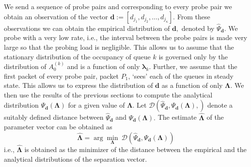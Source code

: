 \documentclass[11pt]{article}
\begin{document}
We send a sequence of probe pairs and corresponding to every probe
pair we obtain an observation of the vector $\mathbf{d}:= [d_{j_1},
d_{j_2}, \ldots, d_{j_\kappa}].$ From these observations we can obtain
the empirical distribution of $\mathbf{d},$ denoted by
$\hat{\Psi}_{\mathbf{d}}$. We probe with a very low rate, i.e., the
interval between the probe pairs is made very large so that the
probing load is negligible.  This allows us to assume that the
stationary distribution of the occupancy of queue $k$ is governed only
by the distribution of $A_0^{(k)}$ and is a function of only
$\mathbf{\lambda}_k.$ Further, we assume that the first packet of
every probe pair, packet $P_1$, `sees' each of the queues in steady
state. This allows us to express the distribution of $\mathbf{d}$ as a
function of only $\mathbf{\Lambda}.$ We then use the results of the
previous sections to compute the analytical distribution
$\Psi_\mathbf{d} (\mathbf{\Lambda})$ for a given value of
$\mathbf{\Lambda}.$ Let $\mathcal{D}\left( \hat{\Psi}_{\mathbf{d}},
  \Psi_\mathbf{d} (\mathbf{\Lambda}), \right)$ denote a suitably
defined distance between $\hat{\Psi}_{\mathbf{d}}$ and
$\Psi_\mathbf{d} (\mathbf{\Lambda}).$ The estimate
$\hat{\mathbf{\Lambda}}$ of the parameter vector can be obtained as
\begin{displaymath}
  \hat{\mathbf{\Lambda}} = \arg \min_{\mathbf{\Lambda}} \ 
  \mathcal{D}\left( \hat{\Psi}_{\mathbf{d}}, \Psi_\mathbf{d}
    (\mathbf{\Lambda}) \right)  
\end{displaymath}
i.e., $\hat{\mathbf{\Lambda}}$ is obtained as the minimizer of the
distance between the empirical and the analytical distributions of the
separation vector.  
\end{document}
